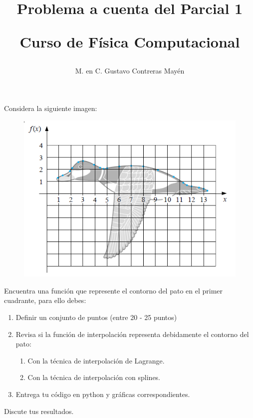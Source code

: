 \documentclass[letterpaper]{article}
\title{Problema a cuenta del Parcial 1 \\ \begin{large}Curso de Física Computacional\end{large}}
\author{M. en C. Gustavo Contreras Mayén}
\date{ }
\begin{document}
\maketitle
\fontsize{14}{14}\selectfont
{}
Considera la siguiente imagen:
\begin{figure}[H]
	\centering
	\includegraphics[scale=1.3]{Imagenes/ContornoPato.png} 
\end{figure}
Encuentra una función que represente el contorno del pato en el primer cuadrante, para ello debes:
\begin{enumerate}
\item Definir un conjunto de puntos (entre 20 - 25 puntos)
\item Revisa si la función de interpolación representa debidamente el contorno del pato:
\begin{enumerate}
\item Con la técnica de interpolación de Lagrange.
\item Con la técnica de interpolación con splines.
\end{enumerate}
\item Entrega tu código en python y gráficas correspondientes.
\end{enumerate}
Discute tus resultados.
\end{document}
